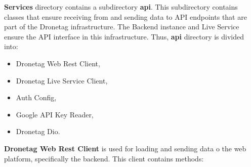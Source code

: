 \textbf{Services} directory contains a subdirectory \textbf{api}.
This subdirectory contains classes that ensure receiving from and sending data to API endpoints that are part of the Dronetag infrastructure.
The Backend instance and Live Service ensure the API interface in this infrastructure.
Thus, \textbf{api} directory is divided into:
\begin{itemize}
    \item Dronetag Web Rest Client,
    \item Dronetag Live Service Client,
    \item Auth Config,
    \item Google API Key Reader,
    \item Dronetag Dio.
\end{itemize}
\newpage
\textbf{Dronetag Web Rest Client} is used for loading and sending data o the web platform, specifically the backend.
This client contains methods:
